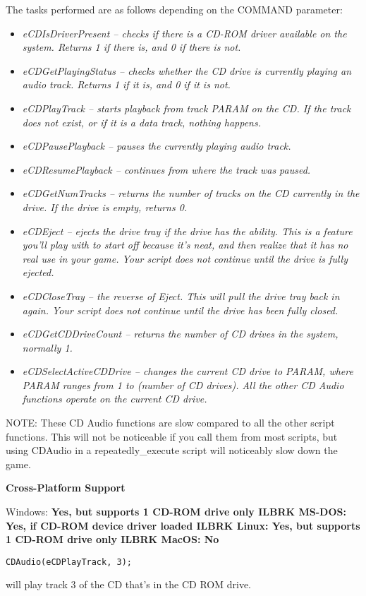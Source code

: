 The tasks performed are as follows depending on the COMMAND parameter:
\begin{itemize}
\item \it{eCDIsDriverPresent} -- checks if there is a CD-ROM driver available on
   the system. Returns 1 if there is, and 0 if there is not.
\item \it{eCDGetPlayingStatus} -- checks whether the CD drive is currently playing
   an audio track. Returns 1 if it is, and 0 if it is not.
\item \it{eCDPlayTrack} -- starts playback from track PARAM on the CD. If the track
   does not exist, or if it is a data track, nothing happens.
\item \it{eCDPausePlayback} -- pauses the currently playing audio track.
\item \it{eCDResumePlayback} -- continues from where the track was paused.
\item \it{eCDGetNumTracks} -- returns the number of tracks on the CD
   currently in the drive. If the drive is empty, returns 0.
\item \it{eCDEject} -- ejects the drive tray if the drive has the ability. This is
   a feature you'll play with to start off because it's neat, and then
   realize that it has no real use in your game.
   Your script does not continue until the drive is fully ejected.
\item \it{eCDCloseTray} -- the reverse of Eject. This will pull the drive tray back
   in again. Your script does not continue until the drive has been
   fully closed.
\item \it{eCDGetCDDriveCount} -- returns the number of CD drives in the
   system, normally 1.
\item \it{eCDSelectActiveCDDrive} -- changes the current CD drive to PARAM,
   where PARAM ranges from 1 to (number of CD drives). All the other
   CD Audio functions operate on the current CD drive.
\end{itemize}
NOTE: These CD Audio functions are slow compared to all the other script
functions. This will not be noticeable if you call them from most scripts,
but using CDAudio in a repeatedly_execute script will noticeably slow down
the game.

\bf{Cross-Platform Support}

Windows: \bf{ Yes, but supports 1 CD-ROM drive only }ILBRK
MS-DOS: \bf{ Yes, if CD-ROM device driver loaded }ILBRK
Linux: \bf{ Yes, but supports 1 CD-ROM drive only }ILBRK
MacOS: \bf{ No }

\begin{verbatim}
CDAudio(eCDPlayTrack, 3);
\end{verbatim}
will play track 3 of the CD that's in the CD ROM drive.


